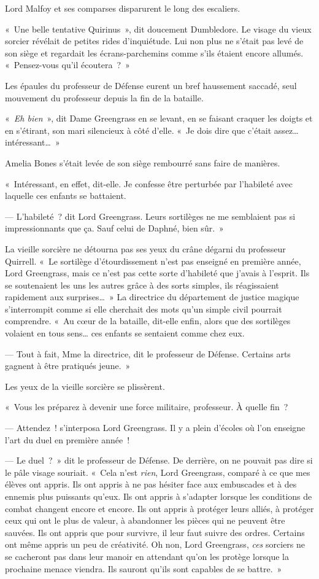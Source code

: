 Lord Malfoy et ses comparses disparurent le long des escaliers.

«~Une belle tentative Quirinus~», dit doucement Dumbledore.
Le visage du vieux sorcier révélait de petites rides d'inquiétude.
Lui non plus ne s'était pas levé de son siège et regardait les écrans-parchemins comme s'ils étaient encore allumés.
«~Pensez-vous qu'il écoutera~?~»

Les épaules du professeur de Défense eurent un bref haussement saccadé, seul mouvement du professeur depuis la fin de la bataille.

«~\emph{Eh bien}~», dit Dame Greengrass en se levant, en se faisant craquer les doigts et en s'étirant, son mari silencieux à côté d'elle.
«~Je dois dire que c'était assez… intéressant…~»

Amelia Bones s'était levée de son siège rembourré sans faire de manières.

«~Intéressant, en effet, dit-elle.
Je confesse être perturbée par l'habileté avec laquelle ces enfants se battaient.

--- L'habileté~? dit Lord Greengrass.
Leurs sortilèges ne me semblaient pas si impressionnants que ça.
Sauf celui de Daphné, bien sûr.~»

La vieille sorcière ne détourna pas ses yeux du crâne dégarni du professeur Quirrell.
«~Le sortilège d'étourdissement n'est pas enseigné en première année, Lord Greengrass, mais ce n'est pas cette sorte d'habileté que j'avais à l'esprit.
Ils se soutenaient les uns les autres grâce à des sorts simples, ils réagissaient rapidement aux surprises…~»
La directrice du département de justice magique s'interrompit comme si elle cherchait des mots qu'un simple civil pourrait comprendre.
«~Au cœur de la bataille, dit-elle enfin, alors que des sortilèges volaient en tous sens… ces enfants se sentaient comme chez eux.

--- Tout à fait, Mme la directrice, dit le professeur de Défense.
Certains arts gagnent à être pratiqués jeune.~»

Les yeux de la vieille sorcière se plissèrent.

«~Vous les préparez à devenir une force militaire, professeur.
À quelle fin~?

--- Attendez~! s'interposa Lord Greengrass.
Il y a plein d'écoles où l'on enseigne l'art du duel en première année~!

--- Le duel~?~»
dit le professeur de Défense.
De derrière, on ne pouvait pas dire si le pâle visage souriait.
«~Cela n'est \emph{rien}, Lord Greengrass, comparé à ce que mes élèves ont appris.
Ils ont appris à ne pas hésiter face aux embuscades et à des ennemis plus puissants qu'eux.
Ils ont appris à s'adapter lorsque les conditions de combat changent encore et encore.
Ils ont appris à protéger leurs alliés, à protéger ceux qui ont le plus de valeur, à abandonner les pièces qui ne peuvent être sauvées.
Ils ont appris que pour survivre, il leur faut suivre des ordres.
Certains ont même appris un peu de créativité.
Oh non, Lord Greengrass, \emph{ces} sorciers ne se cacheront pas dans leur manoir en attendant qu'on les protège lorsque la prochaine menace viendra.
Ils sauront qu'ils sont capables de se battre.~»

